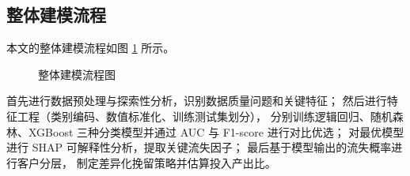 \subsection{整体建模流程}

本文的整体建模流程如图 \ref{fig:flowchart} 所示。

\begin{figure}[H]
    \centering
    \caption{整体建模流程图}
    \label{fig:flowchart}
\end{figure}

首先进行数据预处理与探索性分析，识别数据质量问题和关键特征；
然后进行特征工程（类别编码、数值标准化、训练测试集划分），
分别训练逻辑回归、随机森林、XGBoost 三种分类模型并通过
AUC 与 F1-score 进行对比优选；
对最优模型进行 SHAP 可解释性分析，提取关键流失因子；
最后基于模型输出的流失概率进行客户分层，
制定差异化挽留策略并估算投入产出比。
